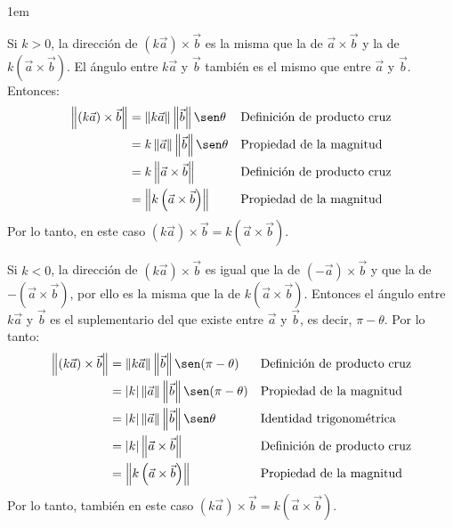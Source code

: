 \documentclass[12pt, fleqn]{report}                             %
\newenvironment{SmallIndentation}[1][0.75em]                    %
        {\begin{adjustwidth}{#1}{}\begin{footnotesize}}             %
        {\end{footnotesize}\end{adjustwidth}}                       %
\theoremstyle{break}                                            %
\newcommand{\Wrap}[1]{\left( #1 \right)}                        %
\newcommand{\abs}[1]{\left\lvert #1 \right\lvert}               %
\newcommand{\Abs}[1]{\left\lVert #1 \right\lVert}               %
\begin{document}
\begin{SmallIndentation}[1em]
\begin{itemize}
                    Si $k>0$, la dirección de $\Wrap{k \vec{a}} \times \vec{b}$ es la misma que la de $\vec{a} \times \vec{b}$ y la de $k\Wrap{\vec{a} \times \vec{b}}$. El ángulo entre $k\vec{a}$ y $\vec{b}$ también es el mismo que entre $\vec{a}$ y $\vec{b}$. Entonces:
                    \begin{align*}
                        \Abs{(k\vec{a}) \times \vec{b}} &= \Abs{k\vec{a}} \Abs{\vec{b}} \sen \theta &&\mbox{Definición de producto cruz}\\
                        &= k \Abs{\vec{a}} \Abs{\vec{b}} \sen \theta &&\mbox{Propiedad de la magnitud}\\
                        &= k \Abs{\vec{a} \times \vec{b}} &&\mbox{Definición de producto cruz}\\
                        &= \Abs{k\Wrap{\vec{a} \times \vec{b}}} && \mbox{Propiedad de la magnitud}
                    \end{align*}
                    Por lo tanto, en este caso $\Wrap{k\vec{a}} \times \vec{b} = k\Wrap{\vec{a} \times \vec{b}}$.
                    
                    Si $k<0$, la dirección de $\Wrap{k\vec{a}} \times \vec{b}$ es igual que la de $\Wrap{-\vec{a}} \times \vec{b}$ y que la de $-\Wrap{\vec{a} \times \vec{b}}$, por ello es la misma que la de $k\Wrap{\vec{a} \times \vec{b}}$. Entonces el ángulo entre $k\vec{a}$ y $\vec{b}$ es el suplementario del que existe entre $\vec{a}$ y $\vec{b}$, es decir, $\pi-\theta$. Por lo tanto:
                    \begin{align*}
                        \Abs{(k\vec{a}) \times \vec{b}} &= \Abs{k\vec{a}} \Abs{\vec{b}} \sen(\pi-\theta) &&\mbox{Definición de producto cruz}\\
                        &= \abs{k} \Abs{\vec{a}} \Abs{\vec{b}} \sen(\pi-\theta) &&\mbox{Propiedad de la magnitud}\\
                        &= \abs{k} \Abs{\vec{a}} \Abs{\vec{b}} \sen \theta &&\mbox{Identidad trigonométrica}\\
                        &= \abs{k} \Abs{\vec{a} \times \vec{b}} && \mbox{Definición de producto cruz}\\
                        &= \Abs{k\Wrap{\vec{a} \times \vec{b}}} && \mbox{Propiedad de la magnitud}
                    \end{align*}
                    Por lo tanto, también en este caso $\Wrap{k\vec{a}} \times \vec{b} = k\Wrap{\vec{a} \times \vec{b}}$.
                    

\end{itemize}
\end{SmallIndentation}
\end{document}
